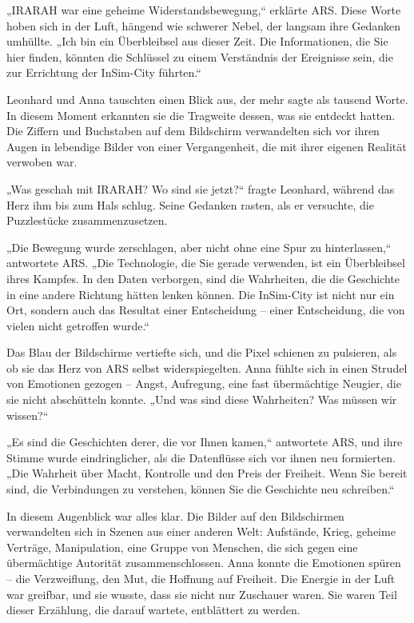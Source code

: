 \documentclass[
]{article}
\begin{document}
„IRARAH war eine geheime Widerstandsbewegung,`` erklärte ARS. Diese
Worte hoben sich in der Luft, hängend wie schwerer Nebel, der langsam
ihre Gedanken umhüllte. „Ich bin ein Überbleibsel aus dieser Zeit. Die
Informationen, die Sie hier finden, könnten die Schlüssel zu einem
Verständnis der Ereignisse sein, die zur Errichtung der InSim-City
führten.``

Leonhard und Anna tauschten einen Blick aus, der mehr sagte als tausend
Worte. In diesem Moment erkannten sie die Tragweite dessen, was sie
entdeckt hatten. Die Ziffern und Buchstaben auf dem Bildschirm
verwandelten sich vor ihren Augen in lebendige Bilder von einer
Vergangenheit, die mit ihrer eigenen Realität verwoben war.

„Was geschah mit IRARAH? Wo sind sie jetzt?{\kern0pt}`` fragte Leonhard,
während das Herz ihm bis zum Hals schlug. Seine Gedanken rasten, als er
versuchte, die Puzzlestücke zusammenzusetzen.

„Die Bewegung wurde zerschlagen, aber nicht ohne eine Spur zu
hinterlassen,`` antwortete ARS. „Die Technologie, die Sie gerade
verwenden, ist ein Überbleibsel ihres Kampfes. In den Daten verborgen,
sind die Wahrheiten, die die Geschichte in eine andere Richtung hätten
lenken können. Die InSim-City ist nicht nur ein Ort, sondern auch das
Resultat einer Entscheidung -- einer Entscheidung, die von vielen nicht
getroffen wurde.``

Das Blau der Bildschirme vertiefte sich, und die Pixel schienen zu
pulsieren, als ob sie das Herz von ARS selbst widerspiegelten. Anna
fühlte sich in einen Strudel von Emotionen gezogen -- Angst, Aufregung,
eine fast übermächtige Neugier, die sie nicht abschütteln konnte. „Und
was sind diese Wahrheiten? Was müssen wir wissen?{\kern0pt}``

„Es sind die Geschichten derer, die vor Ihnen kamen,`` antwortete ARS,
und ihre Stimme wurde eindringlicher, als die Datenflüsse sich vor ihnen
neu formierten. „Die Wahrheit über Macht, Kontrolle und den Preis der
Freiheit. Wenn Sie bereit sind, die Verbindungen zu verstehen, können
Sie die Geschichte neu schreiben.``

In diesem Augenblick war alles klar. Die Bilder auf den Bildschirmen
verwandelten sich in Szenen aus einer anderen Welt: Aufstände, Krieg,
geheime Verträge, Manipulation, eine Gruppe von Menschen, die sich gegen
eine übermächtige Autorität zusammenschlossen. Anna konnte die Emotionen
spüren -- die Verzweiflung, den Mut, die Hoffnung auf Freiheit. Die
Energie in der Luft war greifbar, und sie wusste, dass sie nicht nur
Zuschauer waren. Sie waren Teil dieser Erzählung, die darauf wartete,
entblättert zu werden.
\end{document}
